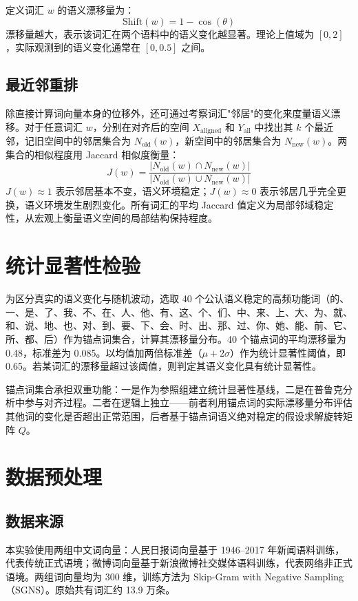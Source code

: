 \documentclass{article}
\begin{document}
定义词汇 $w$ 的语义漂移量为：
\[
\text{Shift}(w) = 1 - \cos(\theta)
\]
漂移量越大，表示该词汇在两个语料中的语义变化越显著。理论上值域为 $[0, 2]$，实际观测到的语义变化通常在 $[0, 0.5]$ 之间。

\subsection{最近邻重排}

除直接计算词向量本身的位移外，还可通过考察词汇"邻居"的变化来度量语义漂移。对于任意词汇 $w$，分别在对齐后的空间 $X_{\text{aligned}}$ 和 $Y_{\text{all}}$ 中找出其 $k$ 个最近邻，记旧空间中的邻居集合为 $N_{\text{old}}(w)$，新空间中的邻居集合为 $N_{\text{new}}(w)$。两集合的相似程度用 Jaccard 相似度衡量：
\[
J(w) = \frac{|N_{\text{old}}(w) \cap N_{\text{new}}(w)|}{|N_{\text{old}}(w) \cup N_{\text{new}}(w)|}
\]
$J(w) \approx 1$ 表示邻居基本不变，语义环境稳定；$J(w) \approx 0$ 表示邻居几乎完全更换，语义环境发生剧烈变化。所有词汇的平均 Jaccard 值定义为局部邻域稳定性，从宏观上衡量语义空间的局部结构保持程度。

\section{统计显著性检验}

为区分真实的语义变化与随机波动，选取 40 个公认语义稳定的高频功能词（的、一、是、了、我、不、在、人、他、有、这、个、们、中、来、上、大、为、就、和、说、地、也、对、到、要、下、会、时、出、那、过、你、她、能、前、它、所、都、后）作为锚点词集合，计算其漂移量分布。40 个锚点词的平均漂移量为 0.48，标准差为 0.085。以均值加两倍标准差（$\mu + 2\sigma$）作为统计显著性阈值，即 0.65。若某词汇的漂移量超过该阈值，则判定其语义变化具有统计显著性。

锚点词集合承担双重功能：一是作为参照组建立统计显著性基线，二是在普鲁克分析中参与对齐过程。二者在逻辑上独立——前者利用锚点词的实际漂移量分布评估其他词的变化是否超出正常范围，后者基于锚点词语义绝对稳定的假设求解旋转矩阵 $Q$。

\section{数据预处理}

\subsection{数据来源}

本实验使用两组中文词向量：人民日报词向量基于 1946--2017 年新闻语料训练，代表传统正式语境；微博词向量基于新浪微博社交媒体语料训练，代表网络非正式语境。两组词向量均为 300 维，训练方法为 Skip-Gram with Negative Sampling（SGNS）。原始共有词汇约 13.9 万条。
\end{document}
